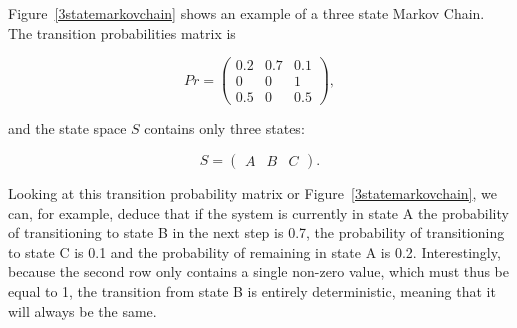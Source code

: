 Figure~\ref{3statemarkovchain} shows an example of a three state Markov Chain. The transition probabilities matrix is 

\[
Pr =
 \begin{pmatrix}
  0.2 & 0.7 & 0.1 \\
  0 & 0 & 1 \\
  0.5 & 0 & 0.5
 \end{pmatrix},
\]

and the state space $S$ contains only three states:

\[
S =
 \begin{pmatrix}
  A & B & C \end{pmatrix}.
\]


Looking at this transition probability matrix or Figure~\ref{3statemarkovchain}, we can, for example, deduce that if the system is currently in state A the probability of transitioning to state B in the next step is 0.7, the probability of transitioning to state C is 0.1 and the probability of remaining in state A is 0.2. Interestingly, because the second row only contains a single non-zero value, which must thus be equal to 1, the transition from state B is entirely deterministic, meaning that it will always be the same.



